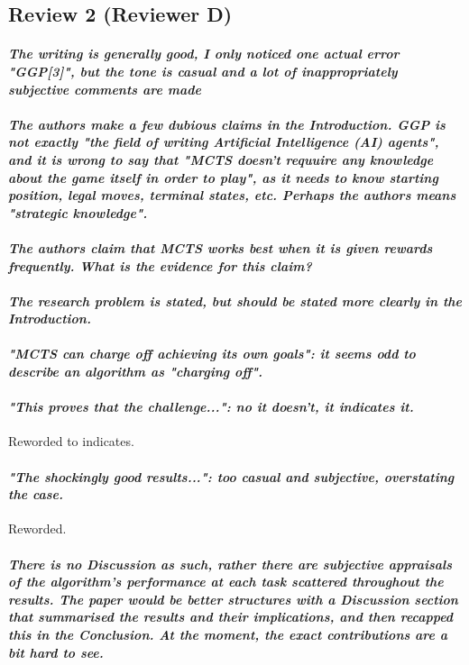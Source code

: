 \documentclass{article}
\begin{document}
\subsection{Review 2 (Reviewer D)}
\paragraph*{\textit{The writing is generally good, I only noticed one actual error "GGP[3]", but the tone is casual and a lot of inappropriately subjective comments are made}}
\paragraph*{\textit{The authors make a few dubious claims in the Introduction. GGP is not exactly "the field of writing Artificial Intelligence (AI) agents", and it is wrong to say that "MCTS doesn't requuire any knowledge about the game itself in order to play", as it needs to know starting position, legal moves, terminal states, etc. Perhaps the authors means "strategic knowledge". }}
\paragraph*{\textit{The authors claim that MCTS works best when it is given rewards frequently. What is the evidence for this claim?}}
\paragraph*{\textit{The research problem is stated, but should be stated more clearly in the Introduction.}}
\paragraph*{\textit{"MCTS can charge off achieving its own goals": it seems odd to describe an algorithm as "charging off".}}
\paragraph*{\textit{"This proves that the challenge...": no it doesn't, it indicates it.}}
Reworded to indicates.
\paragraph*{\textit{"The shockingly good results...": too casual and subjective, overstating the case.}}
Reworded. 
\paragraph*{\textit{There is no Discussion as such, rather there are subjective appraisals of the algorithm's performance at each task scattered throughout the results. The paper would be better structures with a Discussion section that summarised the results and their implications, and then recapped this in the Conclusion. At the moment, the exact contributions are a bit hard to see.}}
\end{document}
